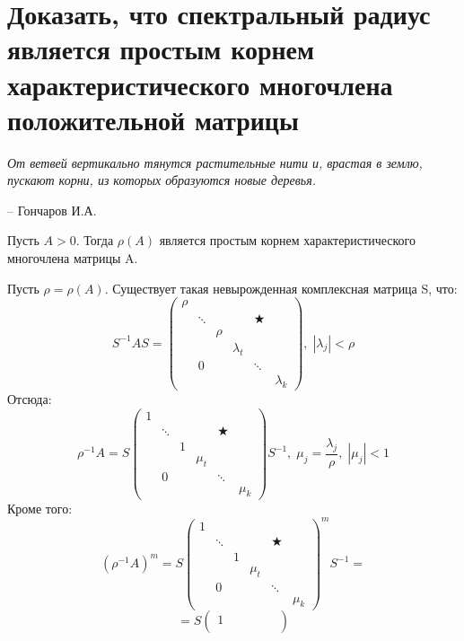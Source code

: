 \chapter{Доказать, что спектральный радиус является простым корнем характеристического многочлена положительной матрицы}
\label{cha:32}

\epigraph{
	\textit{От ветвей вертикально тянутся растительные нити и, врастая в землю, пускают корни, из которых образуются новые деревья.}}
{-- Гончаров И.А.}

\begin{theorem}[]\label{cha:32/the:1}
	Пусть $A > 0$. Тогда $\rho(A)$ является простым корнем характеристического многочлена матрицы A.
\end{theorem}
\begin{Proof}
	Пусть $\rho = \rho(A)$. Существует такая невырожденная комплексная матрица S, что:
	$$S^{-1}AS = \begin{pmatrix}
		\rho &  &  &  &  &  \\
		 & \ddots &  &  & \bigstar & \\
		 &  & \rho &  &  & \\
		 &  &  & \lambda_t &  & \\
		 & 0 &  &  & \ddots & \\
		 &  &  &  &  & \lambda_k
	\end{pmatrix}, \; |\lambda_j| < \rho$$
	Отсюда:
	$$\rho^{-1}A = S \begin{pmatrix}
		1 &  &  &  &  &  \\
		 & \ddots &  &  & \bigstar & \\
		 &  & 1 &  &  & \\
		 &  &  & \mu_t &  & \\
		 & 0 &  &  & \ddots & \\
		 &  &  &  &  & \mu_k
	\end{pmatrix}S^{-1}, \; \mu_j = \frac{\lambda_j}{\rho}, \; |\mu_j| < 1$$
	Кроме того:
	$$(\rho^{-1}A)^m = S \begin{pmatrix}
		1 &  &  &  &  &  \\
		 & \ddots &  &  & \bigstar & \\
		 &  & 1 &  &  & \\
		 &  &  & \mu_t &  & \\
		 & 0 &  &  & \ddots & \\
		 &  &  &  &  & \mu_k
	\end{pmatrix}^m S^{-1} = $$
	$$= S \begin{pmatrix}
		1 &  &  &  &  &  \\

\end{pmatrix}$$
\end{Proof}
